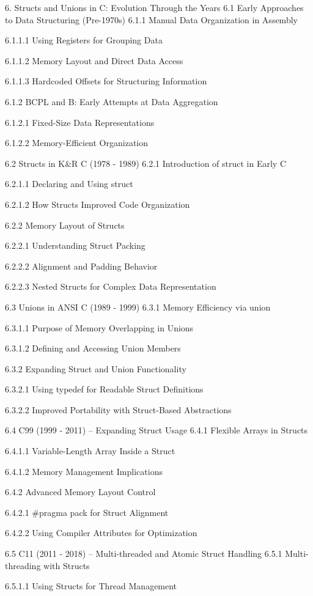 6. Structs and Unions in C: Evolution Through the Years
6.1 Early Approaches to Data Structuring (Pre-1970s)
6.1.1 Manual Data Organization in Assembly

6.1.1.1 Using Registers for Grouping Data

6.1.1.2 Memory Layout and Direct Data Access

6.1.1.3 Hardcoded Offsets for Structuring Information

6.1.2 BCPL and B: Early Attempts at Data Aggregation

6.1.2.1 Fixed-Size Data Representations

6.1.2.2 Memory-Efficient Organization

6.2 Structs in K&R C (1978 - 1989)
6.2.1 Introduction of struct in Early C

6.2.1.1 Declaring and Using struct

6.2.1.2 How Structs Improved Code Organization

6.2.2 Memory Layout of Structs

6.2.2.1 Understanding Struct Packing

6.2.2.2 Alignment and Padding Behavior

6.2.2.3 Nested Structs for Complex Data Representation

6.3 Unions in ANSI C (1989 - 1999)
6.3.1 Memory Efficiency via union

6.3.1.1 Purpose of Memory Overlapping in Unions

6.3.1.2 Defining and Accessing Union Members

6.3.2 Expanding Struct and Union Functionality

6.3.2.1 Using typedef for Readable Struct Definitions

6.3.2.2 Improved Portability with Struct-Based Abstractions

6.4 C99 (1999 - 2011) – Expanding Struct Usage
6.4.1 Flexible Arrays in Structs

6.4.1.1 Variable-Length Array Inside a Struct

6.4.1.2 Memory Management Implications

6.4.2 Advanced Memory Layout Control

6.4.2.1 #pragma pack for Struct Alignment

6.4.2.2 Using Compiler Attributes for Optimization

6.5 C11 (2011 - 2018) – Multi-threaded and Atomic Struct Handling
6.5.1 Multi-threading with Structs

6.5.1.1 Using Structs for Thread Management

